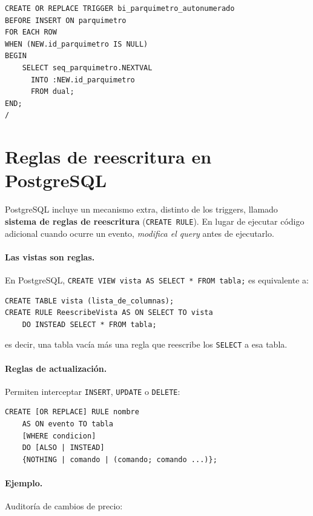 \documentclass[11pt,a4paper]{article}
\begin{document}
\begin{lstlisting}
CREATE OR REPLACE TRIGGER bi_parquimetro_autonumerado
BEFORE INSERT ON parquimetro
FOR EACH ROW
WHEN (NEW.id_parquimetro IS NULL)
BEGIN
    SELECT seq_parquimetro.NEXTVAL
      INTO :NEW.id_parquimetro
      FROM dual;
END;
/
\end{lstlisting}

\section{Reglas de reescritura en PostgreSQL}

PostgreSQL incluye un mecanismo extra, distinto de los triggers,
llamado \textbf{sistema de reglas de reescritura}
(\texttt{CREATE RULE}). En lugar de ejecutar código adicional cuando
ocurre un evento, \emph{modifica el query} antes de ejecutarlo.

\paragraph{Las vistas son reglas.} En PostgreSQL,
\texttt{CREATE VIEW vista AS SELECT * FROM tabla;} es equivalente a:

\begin{lstlisting}
CREATE TABLE vista (lista_de_columnas);
CREATE RULE ReescribeVista AS ON SELECT TO vista
    DO INSTEAD SELECT * FROM tabla;
\end{lstlisting}

es decir, una tabla vacía más una regla que reescribe los
\texttt{SELECT} a esa tabla.

\paragraph{Reglas de actualización.} Permiten interceptar
\texttt{INSERT}, \texttt{UPDATE} o \texttt{DELETE}:

\begin{lstlisting}
CREATE [OR REPLACE] RULE nombre
    AS ON evento TO tabla
    [WHERE condicion]
    DO [ALSO | INSTEAD]
    {NOTHING | comando | (comando; comando ...)};
\end{lstlisting}

\paragraph{Ejemplo.} Auditoría de cambios de precio:
\end{document}
